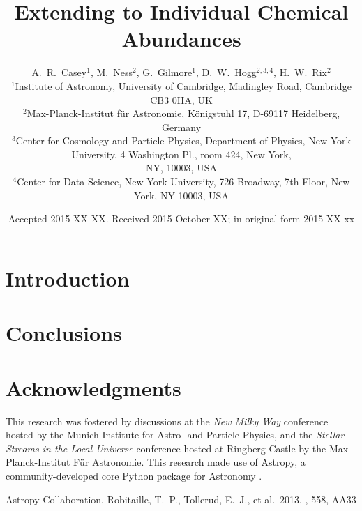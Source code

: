 \documentclass[useAMS,usenatbib]{mn2e}
\title[Cannon Chemistry]{Extending \tc{} to Individual Chemical Abundances}
\author[Casey et al.]{A.~R.~Casey$^1$, M.~Ness$^2$, G.~Gilmore$^1$, D.~W.~Hogg$^{2,3,4}$, H.~W.~Rix$^2$ \\ 
$^1$Institute of Astronomy, University of Cambridge, Madingley Road, Cambridge
    CB3 0HA, UK\\
$^2$Max-Planck-Institut f\"ur Astronomie, K\"onigstuhl 17, D-69117 Heidelberg,
    Germany\\
$^3$Center for Cosmology and Particle Physics, Department of Physics, New York
    University, 4 Washington Pl., room 424, New York, \\
    NY, 10003, USA\\
$^4$Center for Data Science, New York University, 726 Broadway, 7th Floor,
    New York, NY 10003, USA}
\begin{document}
\date{Accepted 2015 XX XX. Received 2015 October XX; in original form 2015 XX xx}

\pagerange{\pageref{firstpage}--\pageref{lastpage}} 

\maketitle

\label{firstpage}

\begin{abstract}
\end{abstract}

\begin{keywords}
\end{keywords}

\section{Introduction}

\section{Conclusions}


\section*{Acknowledgments}
This research was fostered by discussions at the \textit{New Milky Way} conference hosted by the Munich Institute for Astro- and Particle Physics, and the \textit{Stellar Streams in the Local Universe} conference hosted at Ringberg Castle by the Max-Planck-Institut F\"ur Astronomie. This research made use of Astropy, a community-developed core Python package for Astronomy \citep{astropy}.

\begin{thebibliography}{99}
 Astropy Collaboration, Robitaille, T.~P., Tollerud, E.~J., et al.\ 2013, \aap, 558, AA33
\end{thebibliography}


\label{lastpage}
\end{document}
